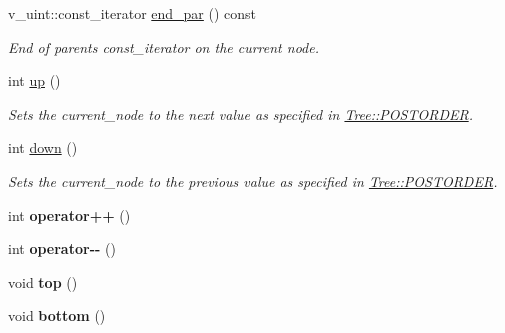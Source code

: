 \begin{DoxyCompactItemize}
\mbox{\label{classTreeIterator_aec582d1a4bf6b892532d41f1f9b8044d}} 
v\+\_\+uint\+::const\+\_\+iterator \hyperlink{classTreeIterator_aec582d1a4bf6b892532d41f1f9b8044d}{end\+\_\+par} () const
\begin{DoxyCompactList}\small\item\em End of parents {\ttfamily const\+\_\+iterator} on the current node. \end{DoxyCompactList}\item 
\mbox{\label{classTreeIterator_af7f80d5909938115bf9e6455ac8950b3}} 
int \hyperlink{classTreeIterator_af7f80d5909938115bf9e6455ac8950b3}{up} ()
\begin{DoxyCompactList}\small\item\em Sets the {\ttfamily current\+\_\+node} to the next value as specified in \hyperlink{classTree_a9cef7f2ba6064b21ce62ab2e7292332a}{Tree\+::\+P\+O\+S\+T\+O\+R\+D\+ER}. \end{DoxyCompactList}\item 
\mbox{\label{classTreeIterator_a0f6bb45c1293ffee50e01fbb9c8a2851}} 
int \hyperlink{classTreeIterator_a0f6bb45c1293ffee50e01fbb9c8a2851}{down} ()
\begin{DoxyCompactList}\small\item\em Sets the {\ttfamily current\+\_\+node} to the previous value as specified in \hyperlink{classTree_a9cef7f2ba6064b21ce62ab2e7292332a}{Tree\+::\+P\+O\+S\+T\+O\+R\+D\+ER}. \end{DoxyCompactList}\item 
\mbox{\label{classTreeIterator_af29b9c5dfd5af02ad768bc5877e5b34f}} 
int {\bfseries operator++} ()
\item 
\mbox{\label{classTreeIterator_a49bfa22ba8b2ac81a4bfde6144133f60}} 
int {\bfseries operator-\/-\/} ()
\item 
\mbox{\label{classTreeIterator_a255656cbdc38f6141292c068cda4f3bf}} 
void {\bfseries top} ()
\item 
\mbox{\label{classTreeIterator_a6c23acfa08f071df762a3c82b05ae0af}} 
void {\bfseries bottom} ()
\item 
\mbox{\label{classTreeIterator_a6666dce3a0d78f229bd26942ebb3ad94}} 

\end{DoxyCompactItemize}
